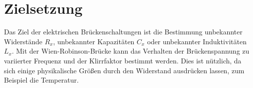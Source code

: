 \section{Zielsetzung}
Das Ziel der elektrischen Brückenschaltungen ist die Bestimmung unbekannter Widerstände $R_x$, 
unbekannter Kapazitäten $C_x$ oder unbekannter Induktivitäten $L_x$.
Mit der Wien-Robinson-Brücke kann das Verhalten der Brückenspannung
zu variierter Frequenz und der Klirrfaktor bestimmt werden.
Dies ist nützlich, da sich einige physikalische Größen durch den Widerstand ausdrücken lassen, zum Beispiel die Temperatur.